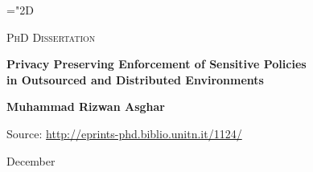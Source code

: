\documentclass[epsfig,a4paper,11pt,titlepage]{book}
\newcommand{\clearemptydoublepage}{\newpage{\pagestyle{empty}\cleardoublepage}}
\numberwithin{algorithm}{chapter}
\begin{document}
\pagestyle{plain}

\mathchardef\mhyphen="2D

\newpage
\clearemptydoublepage
\thispagestyle{empty}

\begin{center}
\Large \textsc{PhD Dissertation} \\ \tiny
\hrulefill 

\vspace{7cm}

\LARGE\textbf{Privacy Preserving Enforcement of Sensitive Policies \\ in Outsourced and Distributed Environments}

\vspace{1cm}

\Large \textbf{Muhammad Rizwan Asghar} \\

\vspace{4cm}

Source: \url{http://eprints-phd.biblio.unitn.it/1124/}

\vspace{4cm}

\hrulefill

\normalsize
December 

\end{center}
\end{document}
